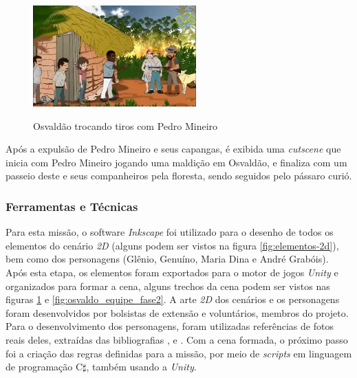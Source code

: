 \begin{figure}[H]
	\centering
	\caption{Osvaldão trocando tiros com Pedro Mineiro}
	\includegraphics[width=0.56\textwidth]{figuras/osvaldo_grileiro_fase2.png}
	\label{fig:osvaldo-grileiro}
	{}
\end{figure}

Após a expulsão de Pedro Mineiro e seus capangas, é exibida uma \textit{cutscene} que inicia com Pedro Mineiro jogando uma maldição em Osvaldão, e finaliza com um passeio deste e seus companheiros pela floresta, sendo seguidos pelo pássaro curió.

\subsubsection{Ferramentas e Técnicas}

Para esta missão, o software \textit{Inkscape} foi utilizado para o desenho de todos os elementos do cenário \textit{2D} (alguns podem ser vistos na figura \ref{fig:elementos-2d}), bem como dos personagens (Glênio, Genuíno, Maria Dina e André Grabóis). Após esta etapa, os elementos foram exportados para o motor de jogos \textit{Unity} e organizados para formar a cena, alguns trechos da cena podem ser vistos nas figuras \ref{fig:osvaldo-grileiro} e \ref{fig:osvaldo_equipe_fase2}. A arte \textit{2D} dos cenários e os personagens foram desenvolvidos por bolsistas de extensão e voluntários, membros do projeto. Para o desenvolvimento dos personagens, foram utilizadas referências de fotos reais deles, extraídas das bibliografias ,  e . Com a cena formada, o próximo passo foi a criação das regras definidas para a missão, por meio de \textit{scripts} em linguagem de programação C$\sharp$, também usando a \textit{Unity}.

